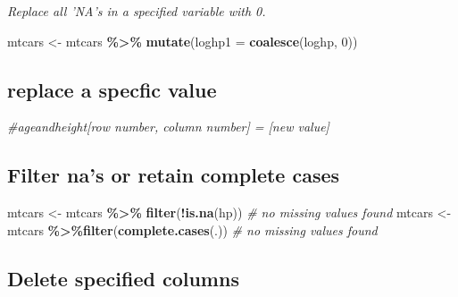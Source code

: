 \documentclass[
]{article}
\newenvironment{Shaded}{\begin{snugshade}}{\end{snugshade}}
\newcommand{\AttributeTok}[1]{\textcolor[rgb]{0.13,0.29,0.53}{#1}}
\newcommand{\CommentTok}[1]{\textcolor[rgb]{0.56,0.35,0.01}{\textit{#1}}}
\newcommand{\DecValTok}[1]{\textcolor[rgb]{0.00,0.00,0.81}{#1}}
\newcommand{\FunctionTok}[1]{\textcolor[rgb]{0.13,0.29,0.53}{\textbf{#1}}}
\newcommand{\NormalTok}[1]{#1}
\newcommand{\OtherTok}[1]{\textcolor[rgb]{0.56,0.35,0.01}{#1}}
\newcommand{\SpecialCharTok}[1]{\textcolor[rgb]{0.81,0.36,0.00}{\textbf{#1}}}
\begin{document}
\emph{Replace all 'NA's in a specified variable with 0.}

\begin{Shaded}
\begin{Highlighting}[]
\NormalTok{mtcars }\OtherTok{\textless{}{-}}\NormalTok{ mtcars }\SpecialCharTok{\%\textgreater{}\%} \FunctionTok{mutate}\NormalTok{(}\AttributeTok{loghp1 =} \FunctionTok{coalesce}\NormalTok{(loghp, }\DecValTok{0}\NormalTok{))}
\end{Highlighting}
\end{Shaded}

\hypertarget{replace-a-specfic-value}{%
\subsection{replace a specfic value}\label{replace-a-specfic-value}}

\begin{Shaded}
\begin{Highlighting}[]
\CommentTok{\#ageandheight[row number, column number] = [new value]}
\end{Highlighting}
\end{Shaded}

\hypertarget{filter-nas-or-retain-complete-cases}{%
\subsection{Filter na's or retain complete cases}\label{filter-nas-or-retain-complete-cases}}

\begin{Shaded}
\begin{Highlighting}[]
\NormalTok{mtcars }\OtherTok{\textless{}{-}}\NormalTok{ mtcars }\SpecialCharTok{\%\textgreater{}\%} \FunctionTok{filter}\NormalTok{(}\SpecialCharTok{!}\FunctionTok{is.na}\NormalTok{(hp)) }\CommentTok{\# no missing values found}
\NormalTok{mtcars }\OtherTok{\textless{}{-}}\NormalTok{ mtcars }\SpecialCharTok{\%\textgreater{}\%}\FunctionTok{filter}\NormalTok{(}\FunctionTok{complete.cases}\NormalTok{(.)) }\CommentTok{\# no missing values found}
\end{Highlighting}
\end{Shaded}

\hypertarget{delete-specified-columns}{%
\subsection{Delete specified columns}\label{delete-specified-columns}}
\end{document}
